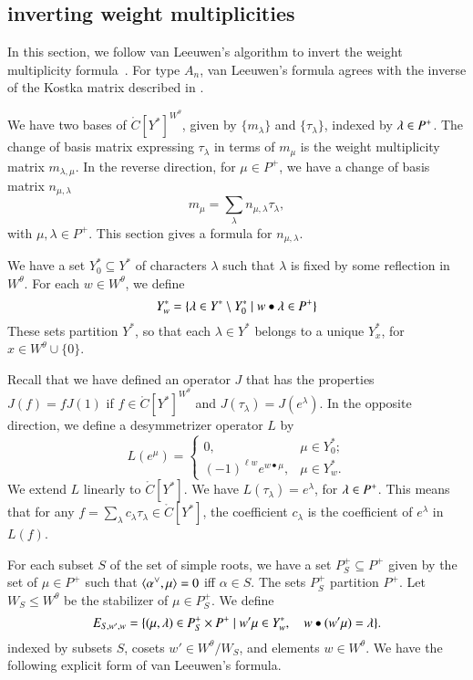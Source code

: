 \subsection{inverting weight multiplicities}

In this section, we follow  van Leeuwen's algorithm to invert the weight multiplicity
formula~\cite{vanleeuwen}.  
For type $A_n$, van Leeuwen's formula agrees with the inverse of the Kostka
matrix described in \cite{duan}.

We have two bases of $\ring{C}[Y^*]^{W^\theta}$, given by $\{m_\lambda\}$ and $\{\tau_\lambda\}$, indexed
by $\lambda\in P^+$.  
The change of basis matrix expressing $\tau_\lambda$ in terms of $m_\mu$ is the weight multiplicity
matrix $m_{\lambda,\mu}$.  In the reverse direction, for $\mu\in P^+$,
we have a change of basis matrix $n_{\mu,\lambda}$ 
\begin{equation}\label{eqn:n}
m_\mu = \sum_{\lambda} n_{\mu,\lambda} \tau_\lambda,
\end{equation}
with $\mu,\lambda\in P^+$.
This section gives a formula for $n_{\mu,\lambda}$.  

We have a set $Y^*_0\subseteq Y^*$ of characters $\lambda$ such that $\lambda$ is fixed by some
reflection in $W^\theta$.  For each $w\in W^\theta$, we define
\[
Y^*_w = \{\lambda\in Y^*\setminus Y^*_0\mid w\bullet \lambda \in P^+\}
\]
These sets partition $Y^*$, so that each $\lambda\in Y^*$ belongs to a unique $Y^*_x$, for $x\in W^\theta\cup\{0\}$.

Recall that we have defined an operator
$J$ that has the properties $J(f) = f J(1)$ if $f\in \ring{C}[Y^*]^{W^\theta}$ and $J(\tau_\lambda) = J(e^\lambda)$.
In the opposite direction, we define a desymmetrizer operator $L$ by
\[
L(e^\mu) = \begin{cases}
0,& \mu\in Y^*_0;\\
(-1)^{\ell{w}} e^{w\bullet \mu},& \mu\in Y^*_w.
\end{cases}
\]
We extend $L$ linearly to $\ring{C}[Y^*]$.
We have $L(\tau_\lambda) = e^\lambda$, for $\lambda\in P^+$.  This means that
for any $f = \sum_\lambda c_\lambda \tau_\lambda \in \ring{C}[Y^*]$, the coefficient $c_\lambda$
is the coefficient of $e^\lambda$ in $L(f)$.

For each subset $S$ of the set of simple roots,
we have a set
$P^+_S \subseteq P^+$ given by the set of $\mu\in P^+$ such that
$\langle{\alpha^\vee,\mu}\rangle=0$ iff $\alpha\in S$.
The sets $P^+_S$ partition $P^+$. 
Let $W_S\le W^\theta$ be the stabilizer of $\mu\in P^+_S$.
We define
\[
E_{S,w',w} = \{(\mu,\lambda)\in P^+_S\times P^+ \mid w'\mu\in Y^*_{w},\quad w\bullet(w'\mu)=\lambda\}.
\]
indexed by subsets $S$, cosets $w'\in W^\theta/W_S$, and elements $w\in W^\theta$.
We have the following explicit form of van Leeuwen's formula.

